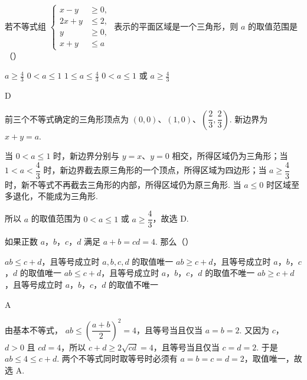 \begin{problem}
若不等式组 \( \begin{cases}
x-y&\geqslant0,\\
2x+y&\leqslant2,\\
y&\geqslant0,\\
x+y&\leqslant a
\end{cases} \) 表示的平面区域是一个三角形，则 \(a\) 的取值范围是（\quad）

\choices
    {\(a \geqslant \frac{4}{3}\)}
    {\(0 < a \leqslant 1\)}
    {\(1 \leqslant a \leqslant \frac{4}{3}\)}
    {\(0 < a \leqslant 1\) 或 \(a \geqslant \frac{4}{3}\)}
\end{problem}

\begin{answer}
D
\end{answer}

\begin{solution}
前三个不等式确定的三角形顶点为 \((0,0)\)、\((1,0)\)、\(\left(\dfrac23,\dfrac23\right)\). 新边界为 \(x+y=a\).

当 \(0<a\leqslant1\) 时，新边界分别与 \(y=x\)、\(y=0\) 相交，所得区域仍为三角形；当 \(1<a<\dfrac43\) 时，新边界截去原三角形的一个顶点，所得区域为四边形；当 \(a\geqslant\dfrac43\) 时，新不等式不再截去三角形的内部，所得区域仍为原三角形. 当 \(a\leqslant0\) 时区域至多退化，不能成为三角形.

所以 \(a\) 的取值范围为 \(0<a\leqslant1\) 或 \(a\geqslant\dfrac43\)，故选 D.
\end{solution}

\begin{problem}
如果正数 \(a\)，\(b\)，\(c\)，\(d\) 满足 \(a + b = cd = 4\). 那么（\quad）

\choices
    {\(ab \leqslant c + d\)，且等号成立时 \(a, b, c, d\) 的取值唯一}
    {\(ab \geq c + d\)，且等号成立时 \(a\)，\(b\)，\(c\)，\(d\) 的取值唯一}
    {\(ab \leqslant c + d\)，且等号成立时 \(a\)，\(b\)，\(c\)，\(d\) 的取值不唯一}
    {\(ab \geqslant c + d\)，且等号成立时 \(a\)，\(b\)，\(c\)，\(d\) 的取值不唯一}
\end{problem}

\begin{answer}
A
\end{answer}

\begin{solution}
由基本不等式，
\(ab\leqslant\left(\dfrac{a+b}{2}\right)^2=4\)，且等号当且仅当 \(a=b=2\).
又因为 \(c\)，\(d>0\) 且 \(cd=4\)，所以
\(c+d\geqslant2\sqrt{cd}=4\)，且等号当且仅当 \(c=d=2\).
于是 \(ab\leqslant4\leqslant c+d\). 两个不等式同时取等号时必须有 \(a=b=c=d=2\)，取值唯一，故选 A.
\end{solution}

